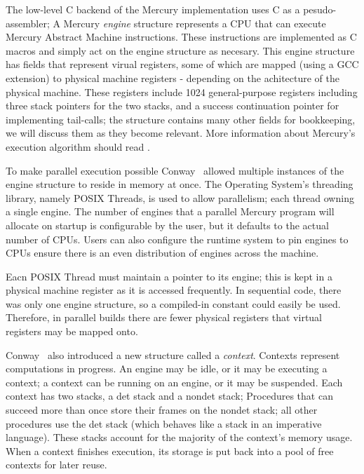 
The low-level C backend of the Mercury implementation uses C as a
pesudo-assembler;
A Mercury \emph{engine} structure represents a CPU that can execute Mercury
Abstract Machine instructions.
These instructions are implemented as C macros and simply act on the
engine structure as necesary.
This engine structure has fields that represent virual registers,
some of which are mapped (using a GCC extension) to physical machine
registers - depending on the achitecture of the physical machine.
These registers include 1024 general-purpose registers including
three stack pointers for the two stacks,
and a success continuation pointer for implementing tail-calls;
the structure contains many other fields for bookkeeping,
we will discuss them as they become relevant.
More information about Mercury's execution algorithm should read
\cite{mercury_jlp}.

To make parallel execution possible Conway~\cite{conway_par} allowed
multiple instances of the engine structure to reside in memory at once.
The Operating System's threading library,
namely POSIX Threads,
is used to allow parallelism;
each thread owning a single engine.
The number of engines that a parallel Mercury program will allocate on startup
is configurable by the user,
but it defaults to the actual number of CPUs.
Users can also configure the runtime system to pin engines to CPUs
ensure there is an even distribution of engines across the machine.

Eacn POSIX Thread must maintain a pointer to its engine;
this is kept in a physical machine register as it is accessed
frequently.
In sequential code,
there was only one engine structure,
so a compiled-in constant could easily be used.
Therefore, in parallel builds there are fewer physical registers that
virtual registers may be mapped onto.

Conway~\cite{conway_par} also introduced a new structure called a
\emph{context}.
Contexts represent computations in progress.
An engine may be idle, or it may be executing a context;
a context can be running on an engine, or it may be suspended.
Each context has two stacks, a det stack and a nondet stack;
Procedures that can succeed more than once
store their frames on the nondet stack;
all other procedures use the det stack
(which behaves like a stack in an imperative language).
These stacks account for the majority of the context's memory usage.
When a context finishes execution,
its storage is put back into a pool of free contexts for
later reuse.

